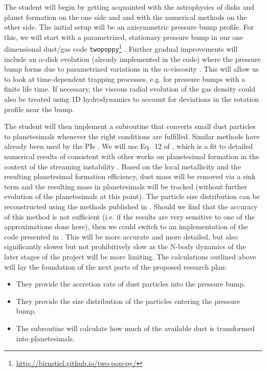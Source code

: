 \documentclass[10pt,fleqn,twoside]{article}
\newcommand{\twopoppy}{\texttt{twopoppy}\xspace}
\begin{document}
The student will begin by getting acquainted with the astrophysics of
disks and planet formation on the one side and and with the numerical
methods on the other side. The initial setup will be an axisymmetric
pressure bump profile. For this, we will start with a parametrized,
stationary pressure bump in our one dimensional dust/gas code
\twopoppy\footnote{\url{http://birnstiel.github.io/two-pop-py/}}
\citep{2012A&A...539A.148B}. Further gradual improvements will include
an $\alpha$-disk evolution (already implemented in the code) where the
pressure bump forms due to parametrized variations in the
$\alpha$-viscosity \citep{2007ApJ...664L..55K}. This will allow us to
look at time-dependent trapping processes, e.g. for pressure bumps
with a finite life time. If necessary, the viscous radial evolution of
the gas density could also be treated using 1D hydrodynamics to
account for deviations in the rotation profile near the bump.

The student will then implement a subroutine that converts small dust
particles to planetesimals whenever the right conditions are
fulfilled. Similar methods have already been used by the PIs
\citep[][and Klahr, Birnstiel, Lenz, in prep.]{2014A&A...572A..78D}.
We will use Eq.~12 of \citet{2014A&A...572A..78D}, which is a fit to
detailed numerical results of \citet{2010ApJ...722.1437B} consistent
with other works on planetesimal formation in the context of the
streaming instability \citep[e.g.][]{2009ApJ...704L..75J}. Based on
the local metallicity and the resulting planetesimal formation
efficiency, dust mass will be removed via a sink term and the
resulting mass in planetesimals will be tracked (without further
evolution of the planetesimals at this point). The particle size
distribution can be reconstructed using the methods published in
\citet{2015ApJ...813L..14B}. Should we find that the accuracy of this
method is not sufficient (i.e. if the results are very sensitive to
one of the approximations done here), then we could switch to an
implementation of the code presented in \citet{2010A&A...513A..79B}.
This will be more accurate and more detailed, but also significantly
slower but not prohibitively slow as the N-body dynamics of the later
stages of the project will be more limiting. The calculations outlined
above will lay the foundation of the next parts of the proposed
research plan:

\begin{itemize}
  \item They provide the accretion rate of dust particles into
  the pressure bump.
  \item They provide the size distribution of the particles entering
  the pressure bump.
  \item The subroutine will calculate how much of the available dust
  is transformed into planetesimals.
\end{itemize}
\end{document}
